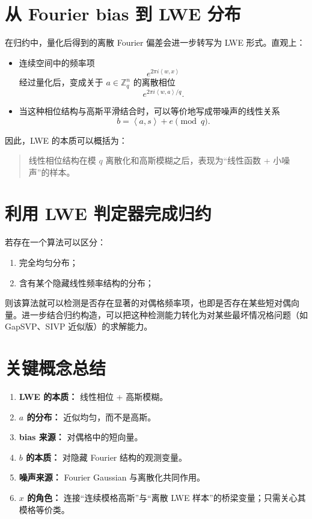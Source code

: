 \documentclass[12pt,a4paper]{ctexart}
\newcommand{\Z}{\mathbb{Z}}
\newcommand{\ip}[2]{\left\langle #1,#2\right\rangle}
\begin{document}
\section{从 Fourier bias 到 LWE 分布}

在归约中，量化后得到的离散 Fourier 偏差会进一步转写为 LWE 形式。直观上：

\begin{itemize}
    \item 连续空间中的频率项
    \[
    e^{2\pi i\ip{w}{x}}
    \]
    经过量化后，变成关于 \(a\in \Z_q^n\) 的离散相位
    \[
    e^{2\pi i\ip{w}{a}/q}.
    \]
    \item 当这种相位结构与高斯平滑结合时，可以等价地写成带噪声的线性关系
    \[
    b=\ip{a}{s}+e \pmod q.
    \]
\end{itemize}

因此，LWE 的本质可以概括为：

\begin{quote}
线性相位结构在模 \(q\) 离散化和高斯模糊之后，表现为“线性函数 + 小噪声”的样本。
\end{quote}

\section{利用 LWE 判定器完成归约}

若存在一个算法可以区分：

\begin{enumerate}[label=\arabic*.]
    \item 完全均匀分布；
    \item 含有某个隐藏线性频率结构的分布；
\end{enumerate}
则该算法就可以检测是否存在显著的对偶格频率项，也即是否存在某些短对偶向量。进一步结合归约构造，可以把这种检测能力转化为对某些最坏情况格问题（如 GapSVP、SIVP 近似版）的求解能力。

\section{关键概念总结}

\begin{enumerate}[label=\arabic*.]
    \item \textbf{LWE 的本质：} 线性相位 + 高斯模糊。
    \item \textbf{\(a\) 的分布：} 近似均匀，而不是高斯。
    \item \textbf{bias 来源：} 对偶格中的短向量。
    \item \textbf{\(b\) 的本质：} 对隐藏 Fourier 结构的观测变量。
    \item \textbf{噪声来源：} Fourier Gaussian 与离散化共同作用。
    \item \textbf{\(x\) 的角色：} 连接“连续模格高斯”与“离散 LWE 样本”的桥梁变量；只需关心其模格等价类。
\end{enumerate}
\end{document}
